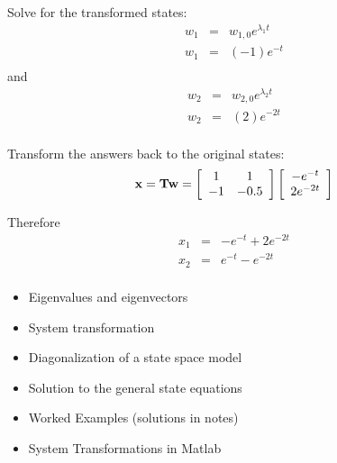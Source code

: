 Solve for the transformed states:
\begin{eqnarray*}
	w_1 & = & w_{1,0}e^{\lambda_1t} \\
	w_1 & = & (-1)e^{-t} \\
\end{eqnarray*}
and
\begin{eqnarray*}
	w_2 & = & w_{2,0}e^{\lambda_2t} \\
	w_2 & = & (2)e^{-2t} \\
\end{eqnarray*}

Transform the answers back to the original states:
\[
{\bf{x}} = {\bf{Tw}} = \left[ {\begin{array}{*{20}c}
   1 & 1  \\
   { - 1} & { - 0.5}  \\
\end{array}} \right]\left[ {\begin{array}{*{20}c}
   { - e^{ - t} }  \\
   {2e^{ - 2t} }  \\
\end{array}} \right]
\]

Therefore
\begin{eqnarray*}
	x_1 & = & -e^{-t} + 2e^{-2t} \\
	x_2 & = & e^{-t}-e^{-2t} \\
\end{eqnarray*}

\ifslidesonly
\begin{slide}
\begin{itemize}
\item Eigenvalues and eigenvectors
\item System transformation
\item Diagonalization of a state space model
\item Solution to the general state equations
\end{itemize}
\end{slide}
\begin{slide}
\begin{itemize}
\item Worked Examples (solutions in notes)
\item System Transformations in Matlab
\end{itemize}
\end{slide}
\fi

